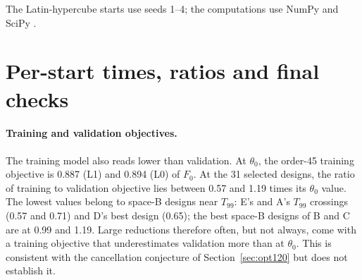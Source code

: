 \documentclass{anvil-paper}
\begin{document}
The Latin-hypercube starts \citep{mckay1979comparison} use seeds 1--4;
the computations use NumPy \citep{harris2020array} and SciPy
\citep{virtanen2020scipy}.

\section{Per-start times, ratios and final checks}\label{sec:exp2-times}
\begin{table}[H]\centering\small
\caption{Charged wall-time units to the first attaining validation,
repeat~1. A dash means the target was not attained within 120 units.
$T_{99}$ was attained by no run in space A.}
\label{tab:exp2-time}
\end{table}

\begin{table}[H]\centering\small
\caption{Paired per-start time ratios (repeat~1). B/A and D/E vary the
optimizer at fixed resolution; E/A and D/B vary the resolution; D/A
compares A with the coarse derivative-free competitor. Ratios above one
favor the denominator. Geometric means use the finite pairs only, so the
D/E and E/A means omit the starts where E failed to attain the target.}
\label{tab:exp2-ratios}
\end{table}

\begin{table}[H]\centering\scriptsize
\caption{Final checks of the selected designs. ``best'' marks a method's
representative; ``A $T_{90}$'' marks the earliest repeat-1 crossing of that
target by that method. The L2 column is the primary check on the
refinement host. L3 and conforming changes are in percent; the 40-angle,
tight and shifted changes are relative, in units of $10^{-4}$. ``held-out'' is the objective at currents $0.25$ and
$0.75$ relative to $\theta_0$'s at the same currents. A dash means the
conforming check does not apply because stator offsets are nonzero.}
\label{tab:exp2-refinement}
\end{table}

\paragraph{Training and validation objectives.}
The training model also reads lower than validation. At $\theta_0$, the
order-45 training objective is 0.887 (L1) and 0.894 (L0) of $F_0$. At the
31 selected designs, the ratio of training to validation objective lies
between 0.57 and 1.19 times its $\theta_0$ value. The lowest values belong
to space-B designs near $T_{99}$: E's and A's $T_{99}$ crossings (0.57 and
0.71) and D's best design (0.65); the best space-B designs of B and C are at
0.99 and 1.19. Large reductions therefore often, but not always, come with a
training objective that underestimates validation more than at $\theta_0$.
This is consistent with the cancellation conjecture of
Section~\ref{sec:opt120} but does not establish it.
\end{document}
